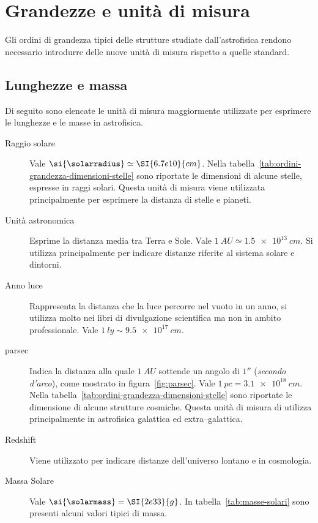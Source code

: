 \section{Grandezze e unità di misura}\label{sec:unita-di-misura}
Gli ordini di grandezza tipici delle strutture studiate dall'astrofisica rendono necessario introdurre delle nuove unità di misura rispetto a quelle standard.

\subsection{Lunghezze e massa}
Di seguito sono elencate le unità di misura maggiormente utilizzate per esprimere le lunghezze e le masse in astrofisica.
\begin{description}
    \item[Raggio solare] Vale $\si{\solarradius} \simeq \SI{6.7e10}{cm}$. Nella tabella~\ref{tab:ordini-grandezza-dimensioni-stelle} sono riportate le dimensioni di alcune stelle, espresse in raggi solari. Questa unità di misura viene utilizzata principalmente per esprimere la distanza di stelle e pianeti.
    \item[Unità astronomica] Esprime la distanza media tra Terra e Sole. Vale $\SI{1}{AU} \simeq \SI{1.5e13}{cm}$. Si utilizza principalmente per indicare distanze riferite al sistema solare e dintorni.
    \item[Anno luce] Rappresenta la distanza che la luce percorre nel vuoto in un anno, si utilizza molto nei libri di divulgazione scientifica ma non in ambito professionale. Vale $\SI{1}{ly} \sim \SI{9.5e17}{cm}$.
    \item[parsec] Indica la distanza alla quale $\SI{1}{AU}$ sottende un angolo di $\ang{;;1}$ (\emph{secondo d'arco}), come mostrato in figura~\ref{fig:parsec}. Vale $\SI{1}{pc} = \SI{3.1e18}{cm}$. Nella tabella~\ref{tab:ordini-grandezza-dimensioni-stelle} sono riportate le dimensione di alcune strutture cosmiche. Questa unità di misura di utilizza principalmente in astrofisica galattica ed extra--galattica.
    \item[Redshift] Viene utilizzato per indicare distanze dell'universo lontano e in cosmologia.
    \item[Massa Solare] Vale $\si{\solarmass} = \SI{2e33}{g}$. In tabella~\ref{tab:masse-solari} sono presenti alcuni valori tipici di massa.
\end{description}

